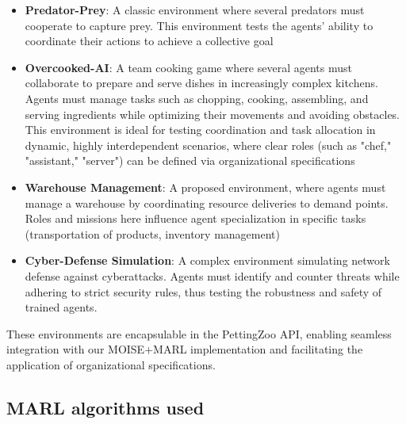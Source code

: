 \documentclass[sigconf,anonymous]{aamas}
\begin{document}
\begin{itemize}
    \item \textbf{Predator-Prey}: A classic environment where several predators must cooperate to capture prey. This environment tests the agents' ability to coordinate their actions to achieve a collective goal\cite{lowe2017multi}

    \item \textbf{Overcooked-AI}: A team cooking game where several agents must collaborate to prepare and serve dishes in increasingly complex kitchens\cite{overcookedai}. Agents must manage tasks such as chopping, cooking, assembling, and serving ingredients while optimizing their movements and avoiding obstacles. This environment is ideal for testing coordination and task allocation in dynamic, highly interdependent scenarios, where clear roles (such as "chef," "assistant," "server") can be defined via organizational specifications
    
    \item \textbf{Warehouse Management}: A proposed environment, where agents must manage a warehouse by coordinating resource deliveries to demand points. Roles and missions here influence agent specialization in specific tasks (transportation of products, inventory management)
    
    \item \textbf{Cyber-Defense Simulation}: A complex environment simulating network defense against cyberattacks. Agents must identify and counter threats while adhering to strict security rules, thus testing the robustness and safety of trained agents\cite{Maxwell2021}.
\end{itemize}

These environments are encapsulable in the PettingZoo API, enabling seamless integration with our MOISE+MARL implementation and facilitating the application of organizational specifications.

\subsection{MARL algorithms used}
\end{document}
